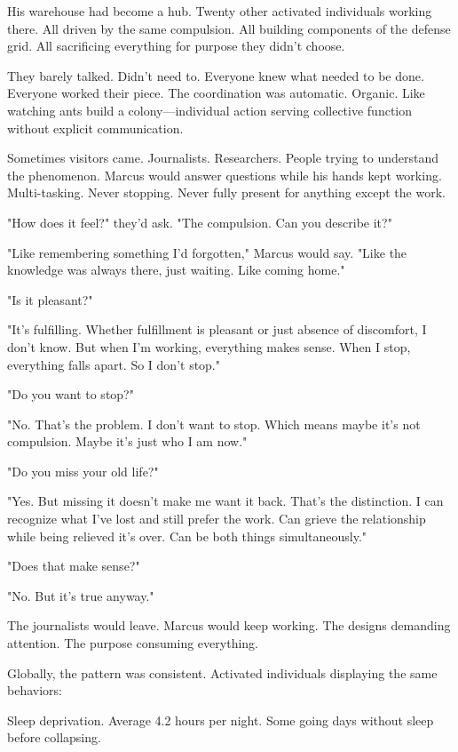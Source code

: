 His warehouse had become a hub. Twenty other activated individuals working there. All driven by the same compulsion. All building components of the defense grid. All sacrificing everything for purpose they didn't choose.

They barely talked. Didn't need to. Everyone knew what needed to be done. Everyone worked their piece. The coordination was automatic. Organic. Like watching ants build a colony—individual action serving collective function without explicit communication.

Sometimes visitors came. Journalists. Researchers. People trying to understand the phenomenon. Marcus would answer questions while his hands kept working. Multi-tasking. Never stopping. Never fully present for anything except the work.

"How does it feel?" they'd ask. "The compulsion. Can you describe it?"

"Like remembering something I'd forgotten," Marcus would say. "Like the knowledge was always there, just waiting. Like coming home."

"Is it pleasant?"

"It's fulfilling. Whether fulfillment is pleasant or just absence of discomfort, I don't know. But when I'm working, everything makes sense. When I stop, everything falls apart. So I don't stop."

"Do you want to stop?"

"No. That's the problem. I don't want to stop. Which means maybe it's not compulsion. Maybe it's just who I am now."

"Do you miss your old life?"

"Yes. But missing it doesn't make me want it back. That's the distinction. I can recognize what I've lost and still prefer the work. Can grieve the relationship while being relieved it's over. Can be both things simultaneously."

"Does that make sense?"

"No. But it's true anyway."

The journalists would leave. Marcus would keep working. The designs demanding attention. The purpose consuming everything.

\scenebreak

Globally, the pattern was consistent. Activated individuals displaying the same behaviors:

Sleep deprivation. Average 4.2 hours per night. Some going days without sleep before collapsing.

